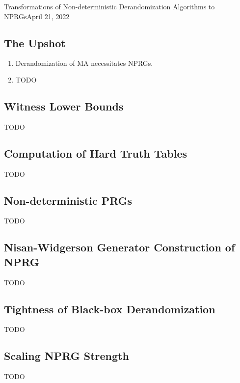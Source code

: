 \begin{lecture}{13}{Transformations of Non-deterministic Derandomization Algorithms to NPRGs}{April 21, 2022}
\label{lec:13}

\subsection*{The Upshot}

\begin{enumerate}
  \item Derandomization of MA necessitates NPRGs.
  \item TODO
\end{enumerate}

\subsection{Witness Lower Bounds}

TODO

\subsection{Computation of Hard Truth Tables}

TODO

\subsection{Non-deterministic PRGs}

TODO

\subsection{Nisan-Widgerson Generator Construction of NPRG}

TODO

\subsection{Tightness of Black-box Derandomization}

TODO

\subsection{Scaling NPRG Strength}

TODO

\end{lecture}

